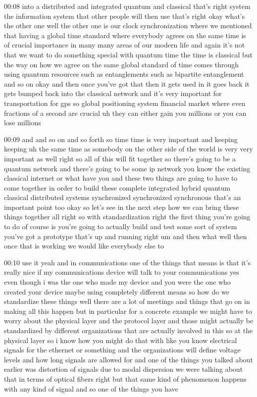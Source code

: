 00:08
into a distributed and integrated quantum and classical that's right
system the information system that other people will then use that's right
okay what's the other one well the other one is our
clock synchronization where we mentioned that
having a global time standard where everybody agrees on the same time is of
crucial importance in many many areas of our modern life and again
it's not that we want to do something special with quantum time
the time is classical but the way on how we agree
on the same global standard of time comes through using quantum resources
such as entanglements such as bipartite entanglement and so on
okay and then once you've got that then it gets used in
it goes back it gets bumped back into the classical network and it's very
important for transportation for gps so global positioning system financial
market where even fractions of a second are crucial
uh they can either gain you millions or you can lose millions

00:09
and and so on and so forth so time time is very important and keeping
keeping uh the same time as somebody on the other side of the world
is very very important as well right so all of this will fit together
so there's going to be a quantum network and there's going to be some ip network
you know the existing classical internet or what have you
and these two things are going to have to come together in order to build these
complete integrated hybrid quantum classical distributed systems
synchronized synchronized synchronous that's an important point too
okay so let's see in the next step how we can bring these things together
all right so with standardization right the first thing you're going to do of
course is you're going to actually build and test some
sort of system you've got a prototype that's up and running right
um and then what well then once that is working we would like everybody else to

00:10
use it yeah and in communications one of the things that means
is that it's really nice if my communications device will talk to your
communications yes even though i was the one who made
my device and you were the one who created your device
maybe using completely different means so
how do we standardize these things well there are a lot of meetings and things
that go on in making all this happen but in particular for a concrete example
we might have to worry about the physical layer and the protocol
layer and those might actually be standardized
by different organizations that are actually involved in this so
at the physical layer so i know how you might do that with like you know
electrical signals for the ethernet or something
and the organizations will define voltage levels and how long signals
are allowed for and one of the things you talked about
earlier was distortion of signals due to modal dispersion we were talking about
that in terms of optical fibers right but that same kind
of phenomenon happens with any kind of signal and so one of the things you have

